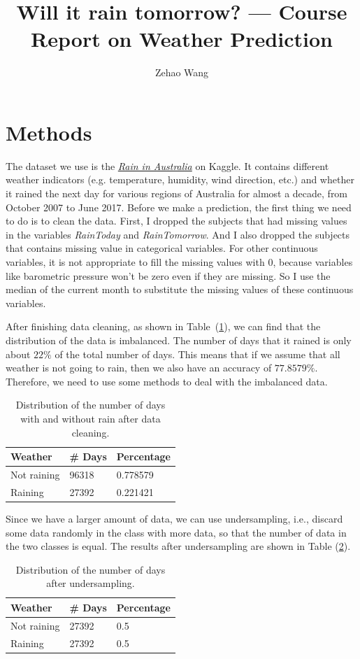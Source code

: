 \documentclass[11pt, a4paper, jou]{apa7}
\title{Will it rain tomorrow? --- Course Report on Weather Prediction}
\author{Zehao Wang}
\begin{document}
\maketitle
\section{Methods}
The dataset we use is the \href{https://www.kaggle.com/datasets/jsphyg/weather-dataset-rattle-package}{\emph{Rain in Australia}} on Kaggle. It contains different weather indicators (e.g. temperature, humidity, wind direction, etc.) and whether it rained the next day for various regions of Australia for almost a decade, from October 2007 to June 2017. Before we make a prediction, the first thing we need to do is to clean the data. First, I dropped the subjects that had missing values in the variables \emph{RainToday} and \emph{RainTomorrow}. And I also dropped the subjects that contains missing value in categorical variables. For other continuous variables, it is not appropriate to fill the missing values with $0$, because variables like barometric pressure won't be zero even if they are missing. So I use the median of the current month to substitute the missing values of these continuous variables. 

After finishing data cleaning, as shown in Table~(\ref{tab:day_imbalance}), we can find that the distribution of the data is imbalanced. The number of days that it rained is only about $22\%$ of the total number of days. This means that if we assume that all weather is not going to rain, then we also have an accuracy of $77.8579\%$. Therefore, we need to use some methods to deal with the imbalanced data. 
\begin{table}[h]
    \centering
    \caption{Distribution of the number of days with and without rain after data cleaning.}
    \label{tab:day_imbalance}
    \begin{tabular}{lll}
    \hline
    Weather     & \# Days & Percentage \\ \hline
    Not raining & 96318   & 0.778579   \\
    Raining     & 27392   & 0.221421   \\ \hline
    \end{tabular}
\end{table}

Since we have a larger amount of data, we can use undersampling, i.e., discard some data randomly in the class with more data, so that the number of data in the two classes is equal. The results after undersampling are shown in Table (\ref{tab:day_undersampling}). 
\begin{table}[h]
    \centering
    \caption{Distribution of the number of days after undersampling.}
    \label{tab:day_undersampling}
    \begin{tabular}{lll}
    \hline
    Weather     & \# Days & Percentage \\ \hline
    Not raining & 27392   & 0.5   \\
    Raining     & 27392   & 0.5   \\ \hline
    \end{tabular}
\end{table}
\end{document}
